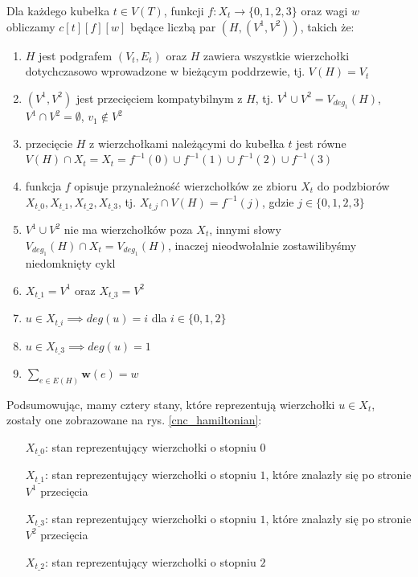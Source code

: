 \documentclass[12pt, oneside]{report}
\begin{document}
Dla każdego kubełka $t \in V(T)$, funkcji $f: X_t \to \{0,1,2,3\}$ oraz wagi $w$ obliczamy $c[t][f][w]$ będące liczbą par $(H, (V^1, V^2))$, takich że:

\begin{enumerate}
\item $H$ jest podgrafem $(V_t, E_t)$ oraz $H$ zawiera wszystkie wierzchołki dotychczasowo wprowadzone w bieżącym poddrzewie, tj. $V(H) = V_t$
\item $(V^1, V^2)$ jest przecięciem kompatybilnym z $H$, tj. $V^1 \cup V^2 = V_{deg_1}(H)$, $V^1 \cap V^2 = \emptyset$, $v_1 \notin V^2$
\item przecięcie $H$ z wierzchołkami należącymi do kubełka $t$ jest równe $V(H) \cap X_t = X_t = f^{-1}(0) \cup f^{-1}(1) \cup f^{-1}(2) \cup f^{-1}(3)$
\item funkcja $f$ opisuje przynależność wierzchołków ze zbioru $X_t$ do podzbiorów $X_{t\_0}, X_{t\_1}, X_{t\_2}, X_{t\_3}$, tj. $X_{t\_j} \cap V(H) = f^{-1}(j)$, gdzie $j \in \{0,1,2,3\}$
\item $V^1 \cup V^2$ nie ma wierzchołków poza $X_t$, innymi słowy $V_{deg_1}(H) \cap X_t = V_{deg_1}(H)$, inaczej nieodwołalnie zostawilibyśmy niedomknięty cykl
\item $X_{t\_1} = V^1$ oraz $X_{t\_3} = V^2$
\item $u \in X_{t\_i} \implies deg(u) = i$ dla $i \in \{0,1,2\}$
\item $u \in X_{t\_3} \implies deg(u) = 1$
\item $\sum_{e \in E(H)} \mathbf{w}(e) = w$
\end{enumerate}
$$$$
Podsumowując, mamy cztery stany, które reprezentują wierzchołki $u \in X_t$, zostały one zobrazowane na rys. \ref{cnc_hamiltonian}: 
\begin{itemize}
\item[$X_{t\_0}$:] stan reprezentujący wierzchołki o stopniu $0$
\item[$X_{t\_1}$:] stan reprezentujący wierzchołki o stopniu $1$, które znalazły się po stronie $V^1$ przecięcia
\item[$X_{t\_3}$:] stan reprezentujący wierzchołki o stopniu $1$, które znalazły się po stronie $V^2$ przecięcia
\item[$X_{t\_2}$:] stan reprezentujący wierzchołki o stopniu $2$
\end{itemize}
\end{document}
